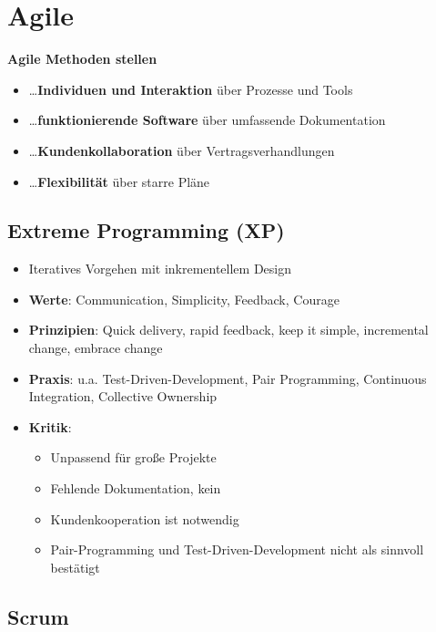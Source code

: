 \section{Agile}
\label{ag:sec:agile}

\textbf{Agile Methoden stellen}
\begin{itemize}
	\item \dots \textbf{Individuen und Interaktion} über Prozesse und Tools
	\item \dots \textbf{funktionierende Software} über umfassende Dokumentation
	\item \dots \textbf{Kundenkollaboration} über Vertragsverhandlungen
	\item \dots \textbf{Flexibilität} über starre Pläne
\end{itemize}

\subsection{Extreme Programming (XP)}
\label{ag:sub:extreme_programming}

\begin{itemize}
	\item Iteratives Vorgehen mit inkrementellem Design
	\item \textbf{Werte}: Communication, Simplicity, Feedback, Courage
	\item \textbf{Prinzipien}: Quick delivery, rapid feedback, keep it simple, incremental change, embrace change
	\item \textbf{Praxis}: u.a. Test-Driven-Development, Pair Programming, Continuous Integration, Collective Ownership
	\item \textbf{Kritik}:
	\begin{itemize}
		\item Unpassend für große Projekte
		\item Fehlende Dokumentation, kein 
		\item Kundenkooperation ist notwendig
		\item Pair-Programming und Test-Driven-Development nicht als sinnvoll bestätigt
	\end{itemize}
\end{itemize}

\subsection{Scrum}
\label{ag:sub:scrum}

